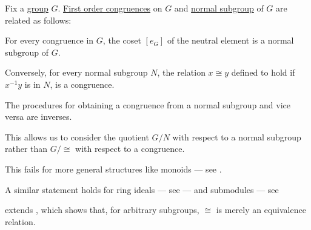 \begin{proposition}\label{thm:normal_subgroups_and_congruences}
  Fix a \hyperref[def:group]{group} \( G \). \hyperref[def:first_order_congruence]{First order congruences} on \( G \) and \hyperref[def:normal_subgroup]{normal subgroup} of \( G \) are related as follows:
  \begin{thmenum}
     For every congruence in \( G \), the coset \( [e_G] \) of the neutral element is a normal subgroup of \( G \).

     Conversely, for every normal subgroup \( N \), the relation \( x \cong y \) defined to hold if \( x^{-1} y \) is in \( N \), is a congruence.

     The procedures for obtaining a congruence from a normal subgroup and vice versa are inverses.
  \end{thmenum}
\end{proposition}
\begin{comments}
  \item This allows us to consider the quotient \( G / N \) with respect to a normal subgroup rather than \( G / {\cong} \) with respect to a congruence.

  \item This fails for more general structures like monoids --- see .

  \item A similar statement holds for ring ideals --- see  --- and submodules --- see 

  \item {} extends , which shows that, for arbitrary subgroups, \( {\cong} \) is merely an equivalence relation.
\end{comments}
